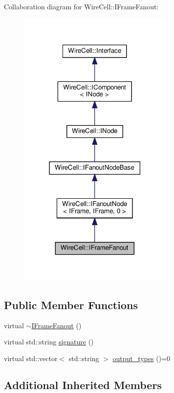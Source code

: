 Collaboration diagram for Wire\+Cell\+:\+:I\+Frame\+Fanout\+:
\nopagebreak
\begin{figure}[H]
\begin{center}
\leavevmode
\includegraphics[width=219pt]{class_wire_cell_1_1_i_frame_fanout__coll__graph}
\end{center}
\end{figure}
\subsection*{Public Member Functions}
\begin{DoxyCompactItemize}
\item 
virtual \hyperlink{class_wire_cell_1_1_i_frame_fanout_a555e111d6764d29afa67bac941516cb9}{$\sim$\+I\+Frame\+Fanout} ()
\item 
virtual std\+::string \hyperlink{class_wire_cell_1_1_i_frame_fanout_af76c4f0a2dc33b08bcf3cad1d04b82f8}{signature} ()
\item 
virtual std\+::vector$<$ std\+::string $>$ \hyperlink{class_wire_cell_1_1_i_frame_fanout_aa54a33e4454b6d2cced872b903641d4a}{output\+\_\+types} ()=0
\end{DoxyCompactItemize}
\subsection*{Additional Inherited Members}


